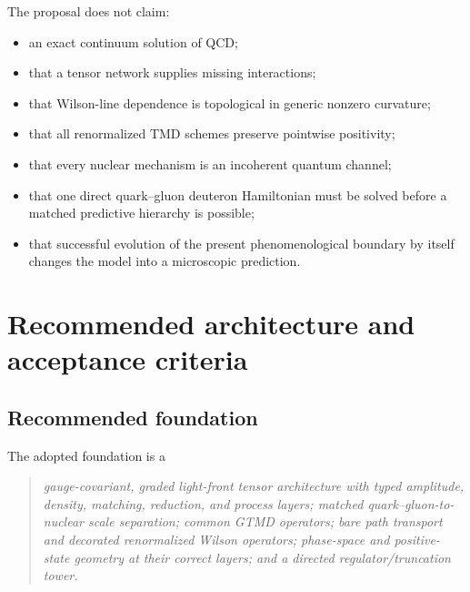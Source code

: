 \documentclass[11pt]{article}
\begin{document}
The proposal does not claim:
\begin{itemize}
\item an exact continuum solution of QCD;
\item that a tensor network supplies missing interactions;
\item that Wilson-line dependence is topological in generic nonzero
curvature;
\item that all renormalized TMD schemes preserve pointwise positivity;
\item that every nuclear mechanism is an incoherent quantum channel;
\item that one direct quark--gluon deuteron Hamiltonian must be solved before
a matched predictive hierarchy is possible;
\item that successful evolution of the present phenomenological boundary by
itself changes the model into a microscopic prediction.
\end{itemize}

\section{Recommended architecture and acceptance criteria}
\label{sec:decision}

\subsection{Recommended foundation}

The adopted foundation is a
\begin{quote}
\emph{gauge-covariant, graded light-front tensor architecture with typed
amplitude, density, matching, reduction, and process layers; matched
quark--gluon-to-nuclear scale separation; common GTMD operators; bare path
transport and decorated renormalized Wilson operators; phase-space and
positive-state geometry at their correct layers; and a directed
regulator/truncation tower.}
\end{quote}
\end{document}
